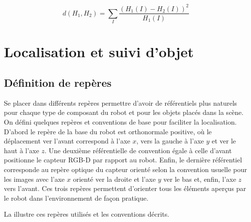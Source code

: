 $$d(H_1, H_2) = \sum _I \frac{\left(H_1(I)-H_2(I)\right)^2}{H_1(I)} $$


\section{Localisation et suivi d'objet}

\subsection{Définition de repères}

Se placer dans différents repères permettre d'avoir de référentiels plus naturels pour chaque type de composant du robot et pour les objets placés dans la scène. On défini quelques repères et conventions de base pour faciliter la localisation. D'abord le repère de la base du robot est orthonormale positive, où le déplacement ver l'avant correspond à l'axe $x$, vers la gauche à l'axe $y$ et ver le haut à l'axe $z$. Une deuxième référentielle de convention égale à celle d'avant positionne le capteur RGB-D par rapport au robot. Enfin, le dernière référentiel corresponde au repère optique du capteur orienté selon la convention usuelle pour les images avec l'axe $x$ orienté ver la droite et l'axe $y$ ver le bas et, enfin, l'axe $z$ vers l'avant. Ces trois repères permettent d'orienter tous les éléments aperçus par le robot dans l'environnement de façon pratique.

La  illustre ces repères utilisés et les conventions décrits.

